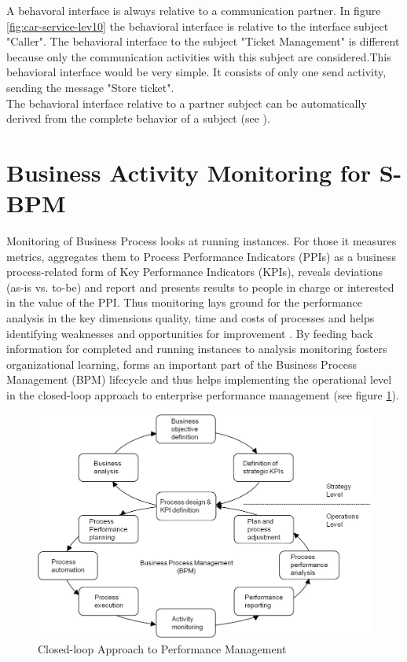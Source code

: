 A behavoral interface is always relative to a communication partner. In figure \ref{fig:car-service-lev10} the behavioral interface is relative to the interface subject "Caller". The behavioral interface to the subject "Ticket Management" is different because only the communication activities with this subject are considered.This behavioral interface would be very simple. It consists of only one send activity, sending the message "Store ticket".\\
The behavioral interface relative to a partner subject can be automatically derived from the complete behavior of a subject
(see \cite{article:jCPEX}).


\section{Business Activity Monitoring for S-BPM}

Monitoring of Business Process looks at running instances. For those it measures metrics, aggregates them to Process Performance Indicators (PPIs) as a business process-related form of Key Performance Indicators (KPIs), reveals deviations (as-is vs. to-be) and report and presents results to people in charge or interested in the value of the PPI. Thus monitoring lays ground for the performance analysis in the key dimensions quality, time and costs of processes and helps identifying weaknesses and opportunities for improvement \cite{book:UntPerform}.
By feeding back information for completed and running instances to analysis monitoring fosters organizational learning, forms an important part of the Business Process Management (BPM) lifecycle \cite{article:SUbjetorientiertBPM} and thus helps implementing the operational level in the closed-loop approach to enterprise performance management \cite{book:processmonitoring} (see figure \ref{fig:Approach-Performance}).
\\


\begin{figure}[h]
	\centering
	\includegraphics[width=0.8\linewidth]{Figures/Chapter5/Monitoring/Approach-Performance-Mgmt.jpg}
	\caption[Closed-loop Approach to Performance Management]{Closed-loop Approach to Performance Management \cite{book:AnalytInfSys}}
	\label{fig:Approach-Performance}
\end{figure}



